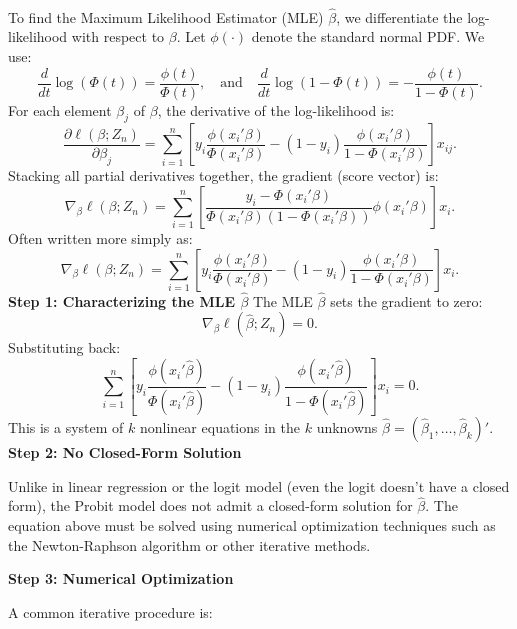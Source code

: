 \documentclass[a4paper,12pt]{article} %
\theoremstyle{nonitalic}
\newenvironment{solution}[1]
  {\renewcommand\theinnercustomsol{#1}\innercustomsol}
  {\endinnercustomsol}
\newcounter{solutionctr}[section]
\renewcommand{\thesolutionctr}{(\alph{solutionctr})}
\newenvironment{autosolution}
  {\stepcounter{solutionctr}\begin{solution}{\thesolutionctr}}
  {\end{solution}}
\begin{document}
\begin{autosolution}
    \
    
    To find the Maximum Likelihood Estimator (MLE) $\hat{\beta}$, we differentiate the log-likelihood with respect to $\beta$. Let $\phi(\cdot)$ denote the standard normal PDF. We use:
    \[
    \frac{d}{dt}\log(\Phi(t)) = \frac{\phi(t)}{\Phi(t)}, \quad \text{and} \quad \frac{d}{dt}\log(1-\Phi(t)) = -\frac{\phi(t)}{1-\Phi(t)}.
    \]
    For each element $\beta_j$ of $\beta$, the derivative of the log-likelihood is:
    \[
    \frac{\partial \ell(\beta;Z_n)}{\partial \beta_j} = \sum_{i=1}^n \left[y_i \frac{\phi(x_i'\beta)}{\Phi(x_i'\beta)} - (1-y_i)\frac{\phi(x_i'\beta)}{1-\Phi(x_i'\beta)}\right]x_{ij}.
    \]
    Stacking all partial derivatives together, the gradient (score vector) is:
    \[
    \nabla_{\beta}\ell(\beta;Z_n) = \sum_{i=1}^n \left[ \frac{y_i - \Phi(x_i'\beta)}{\Phi(x_i'\beta)(1-\Phi(x_i'\beta))} \phi(x_i'\beta) \right] x_i.
    \]
    Often written more simply as:
    \[
    \nabla_{\beta}\ell(\beta;Z_n) = \sum_{i=1}^n \left[ y_i \frac{\phi(x_i'\beta)}{\Phi(x_i'\beta)} - (1-y_i)\frac{\phi(x_i'\beta)}{1-\Phi(x_i'\beta)} \right] x_i.
    \]
    \textbf{Step 1: Characterizing the MLE $\hat{\beta}$}
    The MLE $\hat{\beta}$ sets the gradient to zero:
    \[
    \nabla_{\beta}\ell(\hat{\beta};Z_n) = 0.
    \]
    Substituting back:
    \[
    \sum_{i=1}^n \left[ y_i \frac{\phi(x_i'\hat{\beta})}{\Phi(x_i'\hat{\beta})} - (1-y_i)\frac{\phi(x_i'\hat{\beta})}{1-\Phi(x_i'\hat{\beta})} \right] x_i = 0.
    \]
    This is a system of $k$ nonlinear equations in the $k$ unknowns $\hat{\beta} = (\hat{\beta}_1, \ldots, \hat{\beta}_k)'$.
    \textbf{Step 2: No Closed-Form Solution}

    Unlike in linear regression or the logit model (even the logit doesn't have a closed form), the Probit model does not admit a closed-form solution for $\hat{\beta}$. The equation above must be solved using numerical optimization techniques such as the Newton-Raphson algorithm or other iterative methods.

    \textbf{Step 3: Numerical Optimization}

    A common iterative procedure is:

    
    

\end{autosolution}
\end{document}
